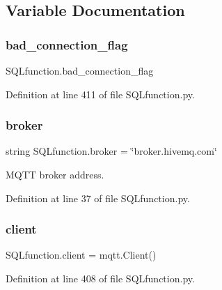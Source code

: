 \subsection{Variable Documentation}
\mbox{\label{namespace_s_q_lfunction_abffdbb58f2363e73ea86ddc83a3893ad}} 
\subsubsection{\texorpdfstring{bad\+\_\+connection\+\_\+flag}{bad\_connection\_flag}}
{\footnotesize\ttfamily S\+Q\+Lfunction.\+bad\+\_\+connection\+\_\+flag}



Definition at line 411 of file S\+Q\+Lfunction.\+py.

\mbox{\label{namespace_s_q_lfunction_aed5ec64d305ca004c4fe54d51dd36a4e}} 
\subsubsection{\texorpdfstring{broker}{broker}}
{\footnotesize\ttfamily string S\+Q\+Lfunction.\+broker = \char`\"{}broker.\+hivemq.\+com\char`\"{}}



M\+Q\+TT broker address. 



Definition at line 37 of file S\+Q\+Lfunction.\+py.

\mbox{\label{namespace_s_q_lfunction_ac9fb782d6f6dcc44fd19ea1b135ab996}} 
\subsubsection{\texorpdfstring{client}{client}}
{\footnotesize\ttfamily S\+Q\+Lfunction.\+client = mqtt.\+Client()}



Definition at line 408 of file S\+Q\+Lfunction.\+py.

